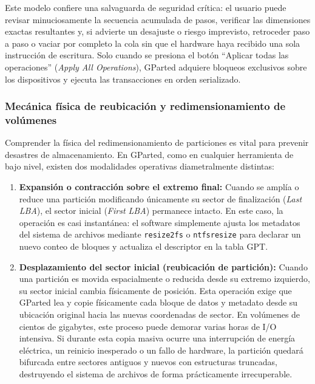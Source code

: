 \documentclass[12pt]{article}
\begin{document}
Este modelo confiere una salvaguarda de seguridad crítica: el usuario puede revisar minuciosamente la secuencia acumulada de pasos, verificar las dimensiones exactas resultantes y, si advierte un desajuste o riesgo imprevisto, retroceder paso a paso o vaciar por completo la cola sin que el hardware haya recibido una sola instrucción de escritura. Solo cuando se presiona el botón \enquote{Aplicar todas las operaciones} (\textit{Apply All Operations}), GParted adquiere bloqueos exclusivos sobre los dispositivos y ejecuta las transacciones en orden serializado.

\subsubsection{Mecánica física de reubicación y redimensionamiento de volúmenes}

Comprender la física del redimensionamiento de particiones es vital para prevenir desastres de almacenamiento. En GParted, como en cualquier herramienta de bajo nivel, existen dos modalidades operativas diametralmente distintas:
\begin{enumerate}[noitemsep, topsep=2pt]
    \item \textbf{Expansión o contracción sobre el extremo final:} Cuando se amplía o reduce una partición modificando únicamente su sector de finalización (\textit{Last LBA}), el sector inicial (\textit{First LBA}) permanece intacto. En este caso, la operación es casi instantánea: el software simplemente ajusta los metadatos del sistema de archivos mediante \texttt{resize2fs} o \texttt{ntfsresize} para declarar un nuevo conteo de bloques y actualiza el descriptor en la tabla GPT.
    \item \textbf{Desplazamiento del sector inicial (reubicación de partición):} Cuando una partición es movida espacialmente o reducida desde su extremo izquierdo, su sector inicial cambia físicamente de posición. Esta operación exige que GParted lea y copie físicamente cada bloque de datos y metadato desde su ubicación original hacia las nuevas coordenadas de sector. En volúmenes de cientos de gigabytes, este proceso puede demorar varias horas de I/O intensiva. Si durante esta copia masiva ocurre una interrupción de energía eléctrica, un reinicio inesperado o un fallo de hardware, la partición quedará bifurcada entre sectores antiguos y nuevos con estructuras truncadas, destruyendo el sistema de archivos de forma prácticamente irrecuperable.
\end{enumerate}
\end{document}
